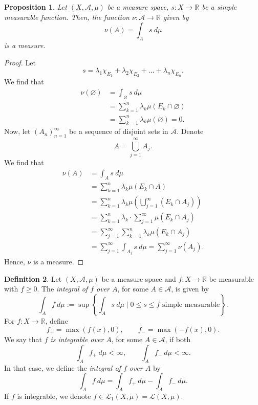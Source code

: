 \documentclass[a4paper, openany]{memoir}
\theoremstyle{definition}
\newtheorem{definition}{Definition}[section]
\theoremstyle{plain}
\newtheorem{proposition}[definition]{Proposition}
\begin{document}
    \begin{proposition}
        Let $(X, \mathcal{A}, \mu)$ be a measure space, $s \colon X \to \mathbb{R}$ be a simple measurable function. Then, the function $\nu \colon \mathcal{A} \to \mathbb{R}$ given by
        \[\nu(A) = \int_A s \ d\mu\]
        is a measure.
    \end{proposition}
    \begin{proof}
        Let
        \[s = \lambda_1 \chi_{E_1} + \lambda_2 \chi_{E_2} + \dots + \lambda_n \chi_{E_n}.\]
        We find that
        \begin{align*}
            \nu (\varnothing) &= \int_{\varnothing} s \ d\mu \\
            &= \sum_{k=1}^n \lambda_k \mu (E_k \cap \varnothing) \\
            &= \sum_{k=1}^n \lambda_k \mu (\varnothing) = 0.
        \end{align*}
        Now, let $(A_n)_{n=1}^\infty$ be a sequence of disjoint sets in $\mathcal{A}$. Denote
        \[A = \bigcup_{j=1}^\infty A_j.\]
        We find that
        \begin{align*}
            \nu (A) &= \int_A s \ d\mu \\
            &= \sum_{k=1}^n \lambda_k \mu(E_k \cap A) \\
            &= \sum_{k=1}^n \lambda_k \mu \left(\bigcup_{j=1}^\infty (E_k \cap A_j)\right) \\
            &= \sum_{k=1}^n \lambda_k \cdot \sum_{j=1}^\infty \mu(E_k \cap A_j) \\
            &= \sum_{j=1}^\infty \sum_{k=1}^n \lambda_k \mu(E_k \cap A_j) \\
            &= \sum_{j=1}^\infty \int_{A_j} s \ d\mu = \sum_{j=1}^\infty \nu(A_j).
        \end{align*}
        Hence, $\nu$ is a measure.
    \end{proof}

    \begin{definition}
        Let $(X, \mathcal{A}, \mu)$ be a measure space and $f \colon X \to \mathbb{R}$ be measurable with $f \geq 0$. The \emph{integral of $f$ over $A$}, for some $A \in \mathcal{A}$, is given by
        \[\int_A f \ d\mu := \sup \left\{\int_A s \ d\mu \mid 0 \leq s \leq f \text{ simple measurable} \right\}.\]
        For $f \colon X \to \mathbb{R}$, define
        \[f_+ = \max(f(x), 0), \qquad f_- = \max(-f(x), 0).\]
        We say that \emph{$f$ is integrable over $A$}, for some $A \in \mathcal{A}$, if both
        \[\int_A f_+ \ d\mu < \infty, \qquad \int_A f_- \ d\mu < \infty.\]
        In that case, we define the \emph{integral of $f$ over $A$} by
        \[\int_A f \ d\mu = \int_A f_+ \ d\mu - \int_A f_- \ d\mu.\]
        If $f$ is integrable, we denote $f \in \mathcal{L}_1(X, \mu) = \mathcal{L}(X, \mu)$.
    \end{definition}
\end{document}
